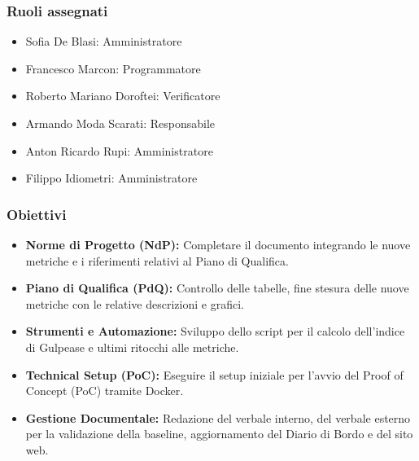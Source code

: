 \subsubsection{Ruoli assegnati}
\begin{itemize}
    \item Sofia De Blasi: Amministratore
    \item Francesco Marcon: Programmatore
    \item Roberto Mariano Doroftei: Verificatore
    \item Armando Moda Scarati: Responsabile
    \item Anton Ricardo Rupi: Amministratore
    \item Filippo Idiometri: Amministratore
\end{itemize}

\subsubsection{Obiettivi}
\begin{itemize}
    \item \textbf{Norme di Progetto (NdP):} Completare il documento integrando le nuove metriche e i riferimenti relativi al Piano di Qualifica.
    \item \textbf{Piano di Qualifica (PdQ):} Controllo delle tabelle, fine stesura delle nuove metriche con le relative descrizioni e grafici.
    \item \textbf{Strumenti e Automazione:} Sviluppo dello script per il calcolo dell'indice di Gulpease e ultimi ritocchi alle metriche.
    \item \textbf{Technical Setup (PoC):} Eseguire il setup iniziale per l'avvio del Proof of Concept (PoC) tramite Docker.
    \item \textbf{Gestione Documentale:} Redazione del verbale interno, del verbale esterno per la validazione della baseline, aggiornamento del Diario di Bordo e del sito web.
\end{itemize}

